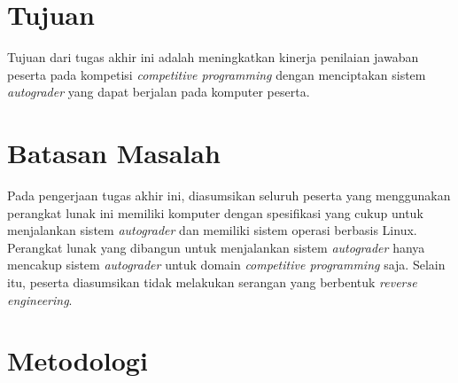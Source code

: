 \section{Tujuan}

\par Tujuan dari tugas akhir ini adalah meningkatkan kinerja penilaian jawaban peserta pada kompetisi \textit{competitive programming} dengan menciptakan sistem \textit{autograder} yang dapat berjalan pada komputer peserta.

\section{Batasan Masalah}

\par Pada pengerjaan tugas akhir ini, diasumsikan seluruh peserta yang menggunakan perangkat lunak ini memiliki komputer dengan spesifikasi yang cukup untuk menjalankan sistem \textit{autograder} dan memiliki sistem operasi berbasis Linux. Perangkat lunak yang dibangun untuk menjalankan sistem \textit{autograder} hanya mencakup sistem \textit{autograder} untuk domain \textit{competitive programming} saja. Selain itu, peserta diasumsikan tidak melakukan serangan yang berbentuk \textit{reverse engineering}.

\section{Metodologi}

